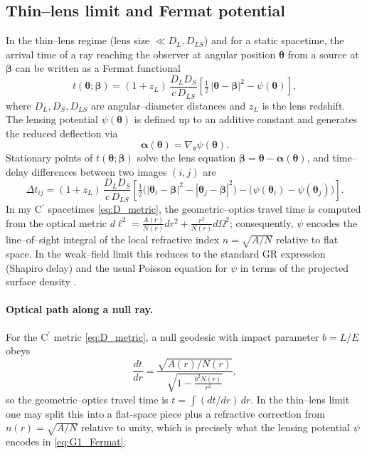 \documentclass{iopjournal}
\begin{document}
\subsection{Thin–lens limit and Fermat potential}\label{app:G1}
In the thin–lens regime (lens size $\ll D_L,D_{LS}$) and for a static spacetime, the arrival time of a ray reaching the observer at angular position $\boldsymbol\theta$ from a source at $\boldsymbol\beta$ can be written as a Fermat functional \cite{SchneiderEhlersFalco1992,BlandfordNarayan1986,Perlick2004LRR}
\begin{equation}
t(\boldsymbol\theta;\boldsymbol\beta)
=(1+z_L)\,\frac{D_L D_S}{c\,D_{LS}}
\left[\tfrac12\,|\boldsymbol\theta-\boldsymbol\beta|^2-\psi(\boldsymbol\theta)\right],
\label{eq:G1_Fermat}
\end{equation}
where $D_L,D_S,D_{LS}$ are angular–diameter distances and $z_L$ is the lens redshift. The lensing potential $\psi(\boldsymbol\theta)$ is defined up to an additive constant and generates the reduced deflection via
\begin{equation}
\boldsymbol\alpha(\boldsymbol\theta)=\nabla_{\!\theta}\psi(\boldsymbol\theta).
\label{eq:G1_alpha_gradpsi}
\end{equation}
Stationary points of $t(\boldsymbol\theta;\boldsymbol\beta)$ solve the lens equation $\boldsymbol\beta=\boldsymbol\theta-\boldsymbol\alpha(\boldsymbol\theta)$, and time–delay differences between two images $(i,j)$ are
\begin{equation}
\Delta t_{ij}=(1+z_L)\,\frac{D_L D_S}{c\,D_{LS}}
\left[\tfrac12\big(|\boldsymbol\theta_i-\boldsymbol\beta|^2-|\boldsymbol\theta_j-\boldsymbol\beta|^2\big)
-\big(\psi(\boldsymbol\theta_i)-\psi(\boldsymbol\theta_j)\big)\right].
\label{eq:G1_dtij}
\end{equation}
In my C$^\prime$ spacetimes \eqref{eq:D_metric}, the geometric–optics travel time is computed from the optical metric $d\ell^2=\frac{A(r)}{N(r)}dr^2+\frac{r^2}{N(r)}d\Omega^2$; consequently, $\psi$ encodes the line–of–sight integral of the local refractive index $n=\sqrt{A/N}$ relative to flat space. In the weak–field limit this reduces to the standard GR expression (Shapiro delay) and the usual Poisson equation for $\psi$ in terms of the projected surface density \cite{SchneiderEhlersFalco1992,Perlick2004LRR}.
\paragraph{Optical path along a null ray.}
For the C$^\prime$ metric \eqref{eq:D_metric}, a null geodesic with impact parameter $b=L/E$ obeys
\begin{equation}
\frac{dt}{dr}=\frac{\sqrt{A(r)/N(r)}}{\sqrt{1-\tfrac{b^{2}N(r)}{r^{2}}}},
\label{eq:G1_dtdr}
\end{equation}
so the geometric–optics travel time is $t=\int (dt/dr)\,dr$. In the thin–lens limit one may split this into a flat-space piece plus a refractive correction from $n(r)=\sqrt{A/N}$ relative to unity, which is precisely what the lensing potential $\psi$ encodes in \eqref{eq:G1_Fermat}.
\end{document}
